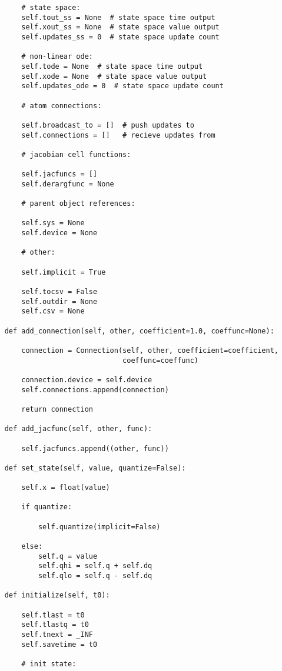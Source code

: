 \begin{lstlisting}
        # state space:
        self.tout_ss = None  # state space time output
        self.xout_ss = None  # state space value output
        self.updates_ss = 0  # state space update count

        # non-linear ode:
        self.tode = None  # state space time output
        self.xode = None  # state space value output
        self.updates_ode = 0  # state space update count

        # atom connections:

        self.broadcast_to = []  # push updates to
        self.connections = []   # recieve updates from

        # jacobian cell functions:

        self.jacfuncs = []
        self.derargfunc = None

        # parent object references:

        self.sys = None
        self.device = None

        # other:

        self.implicit = True

        self.tocsv = False
        self.outdir = None
        self.csv = None

    def add_connection(self, other, coefficient=1.0, coeffunc=None):

        connection = Connection(self, other, coefficient=coefficient,
                                coeffunc=coeffunc)

        connection.device = self.device
        self.connections.append(connection)

        return connection

    def add_jacfunc(self, other, func):

        self.jacfuncs.append((other, func))

    def set_state(self, value, quantize=False):

        self.x = float(value)

        if quantize:

            self.quantize(implicit=False)

        else:
            self.q = value
            self.qhi = self.q + self.dq
            self.qlo = self.q - self.dq

    def initialize(self, t0):

        self.tlast = t0
        self.tlastq = t0
        self.tnext = _INF
        self.savetime = t0

        # init state:


\end{lstlisting}
